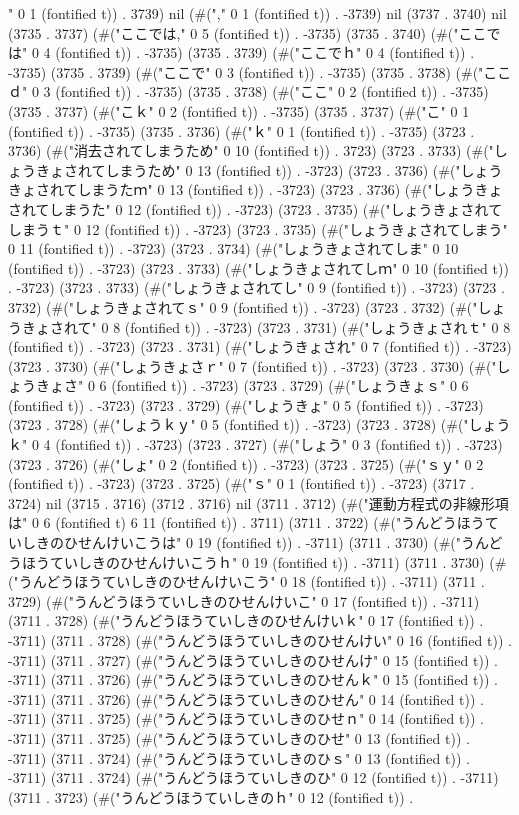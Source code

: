 " 0 1 (fontified t)) . 3739) nil (#("," 0 1 (fontified t)) . -3739) nil (3737 . 3740) nil (3735 . 3737) (#("ここでは," 0 5 (fontified t)) . -3735) (3735 . 3740) (#("ここでは" 0 4 (fontified t)) . -3735) (3735 . 3739) (#("ここでｈ" 0 4 (fontified t)) . -3735) (3735 . 3739) (#("ここで" 0 3 (fontified t)) . -3735) (3735 . 3738) (#("ここｄ" 0 3 (fontified t)) . -3735) (3735 . 3738) (#("ここ" 0 2 (fontified t)) . -3735) (3735 . 3737) (#("こｋ" 0 2 (fontified t)) . -3735) (3735 . 3737) (#("こ" 0 1 (fontified t)) . -3735) (3735 . 3736) (#("ｋ" 0 1 (fontified t)) . -3735) (3723 . 3736) (#("消去されてしまうため" 0 10 (fontified t)) . 3723) (3723 . 3733) (#("しょうきょされてしまうため" 0 13 (fontified t)) . -3723) (3723 . 3736) (#("しょうきょされてしまうたｍ" 0 13 (fontified t)) . -3723) (3723 . 3736) (#("しょうきょされてしまうた" 0 12 (fontified t)) . -3723) (3723 . 3735) (#("しょうきょされてしまうｔ" 0 12 (fontified t)) . -3723) (3723 . 3735) (#("しょうきょされてしまう" 0 11 (fontified t)) . -3723) (3723 . 3734) (#("しょうきょされてしま" 0 10 (fontified t)) . -3723) (3723 . 3733) (#("しょうきょされてしｍ" 0 10 (fontified t)) . -3723) (3723 . 3733) (#("しょうきょされてし" 0 9 (fontified t)) . -3723) (3723 . 3732) (#("しょうきょされてｓ" 0 9 (fontified t)) . -3723) (3723 . 3732) (#("しょうきょされて" 0 8 (fontified t)) . -3723) (3723 . 3731) (#("しょうきょされｔ" 0 8 (fontified t)) . -3723) (3723 . 3731) (#("しょうきょされ" 0 7 (fontified t)) . -3723) (3723 . 3730) (#("しょうきょさｒ" 0 7 (fontified t)) . -3723) (3723 . 3730) (#("しょうきょさ" 0 6 (fontified t)) . -3723) (3723 . 3729) (#("しょうきょｓ" 0 6 (fontified t)) . -3723) (3723 . 3729) (#("しょうきょ" 0 5 (fontified t)) . -3723) (3723 . 3728) (#("しょうｋｙ" 0 5 (fontified t)) . -3723) (3723 . 3728) (#("しょうｋ" 0 4 (fontified t)) . -3723) (3723 . 3727) (#("しょう" 0 3 (fontified t)) . -3723) (3723 . 3726) (#("しょ" 0 2 (fontified t)) . -3723) (3723 . 3725) (#("ｓｙ" 0 2 (fontified t)) . -3723) (3723 . 3725) (#("ｓ" 0 1 (fontified t)) . -3723) (3717 . 3724) nil (3715 . 3716) (3712 . 3716) nil (3711 . 3712) (#("運動方程式の非線形項は" 0 6 (fontified t) 6 11 (fontified t)) . 3711) (3711 . 3722) (#("うんどうほうていしきのひせんけいこうは" 0 19 (fontified t)) . -3711) (3711 . 3730) (#("うんどうほうていしきのひせんけいこうｈ" 0 19 (fontified t)) . -3711) (3711 . 3730) (#("うんどうほうていしきのひせんけいこう" 0 18 (fontified t)) . -3711) (3711 . 3729) (#("うんどうほうていしきのひせんけいこ" 0 17 (fontified t)) . -3711) (3711 . 3728) (#("うんどうほうていしきのひせんけいｋ" 0 17 (fontified t)) . -3711) (3711 . 3728) (#("うんどうほうていしきのひせんけい" 0 16 (fontified t)) . -3711) (3711 . 3727) (#("うんどうほうていしきのひせんけ" 0 15 (fontified t)) . -3711) (3711 . 3726) (#("うんどうほうていしきのひせんｋ" 0 15 (fontified t)) . -3711) (3711 . 3726) (#("うんどうほうていしきのひせん" 0 14 (fontified t)) . -3711) (3711 . 3725) (#("うんどうほうていしきのひせｎ" 0 14 (fontified t)) . -3711) (3711 . 3725) (#("うんどうほうていしきのひせ" 0 13 (fontified t)) . -3711) (3711 . 3724) (#("うんどうほうていしきのひｓ" 0 13 (fontified t)) . -3711) (3711 . 3724) (#("うんどうほうていしきのひ" 0 12 (fontified t)) . -3711) (3711 . 3723) (#("うんどうほうていしきのｈ" 0 12 (fontified t)) . 